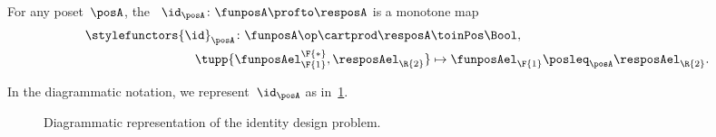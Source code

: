 \begin{definition}
    \label{def:dp-identity}
    For any poset~$\posA$, the \emph{}~$\id_\posA \colon \funposA \profto \resposA$ is a monotone map
    \begin{equation}
        \begin{aligned}
            \stylefunctors{\id}_\posA \colon \funposA\op \cartprod \resposA & \toinPos   \Bool, \label{eq:identity}                      \\
            \tupp{\funposAel_\F{1}^\F{*}, \resposAel_\R{2}}                 & \mapsto \funposAel_\F{1} \posleq_{\posA} \resposAel_\R{2}.
        \end{aligned}
    \end{equation}
\end{definition}
In the diagrammatic notation, we represent~$\id_\posA$ as in~\cref{fig:identitydp}.

\begin{figure}[h!]
    \centering
    \caption{Diagrammatic representation of the identity design problem.} \label{fig:identitydp}
\end{figure}

